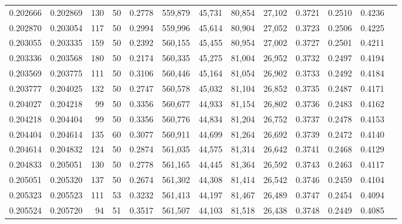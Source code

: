 \begin{tabular}{rrrrrrrrrrrrr}
0.202666 & 0.202869 &   130 &  50 &                                     0.2778 & 559,879 &  45,731 &  80,854 &  27,102 & 0.3721 & 0.2510 & 0.4236 \\
0.202870 & 0.203054 &   117 &  50 &                                     0.2994 & 559,996 &  45,614 &  80,904 &  27,052 & 0.3723 & 0.2506 & 0.4225 \\
0.203055 & 0.203335 &   159 &  50 &                                     0.2392 & 560,155 &  45,455 &  80,954 &  27,002 & 0.3727 & 0.2501 & 0.4211 \\
0.203336 & 0.203568 &   180 &  50 &                                     0.2174 & 560,335 &  45,275 &  81,004 &  26,952 & 0.3732 & 0.2497 & 0.4194 \\
0.203569 & 0.203775 &   111 &  50 &                                     0.3106 & 560,446 &  45,164 &  81,054 &  26,902 & 0.3733 & 0.2492 & 0.4184 \\
0.203777 & 0.204025 &   132 &  50 &                                     0.2747 & 560,578 &  45,032 &  81,104 &  26,852 & 0.3735 & 0.2487 & 0.4171 \\
0.204027 & 0.204218 &    99 &  50 &                                     0.3356 & 560,677 &  44,933 &  81,154 &  26,802 & 0.3736 & 0.2483 & 0.4162 \\
0.204218 & 0.204404 &    99 &  50 &                                     0.3356 & 560,776 &  44,834 &  81,204 &  26,752 & 0.3737 & 0.2478 & 0.4153 \\
0.204404 & 0.204614 &   135 &  60 &                                     0.3077 & 560,911 &  44,699 &  81,264 &  26,692 & 0.3739 & 0.2472 & 0.4140 \\
0.204614 & 0.204832 &   124 &  50 &                                     0.2874 & 561,035 &  44,575 &  81,314 &  26,642 & 0.3741 & 0.2468 & 0.4129 \\
0.204833 & 0.205051 &   130 &  50 &                                     0.2778 & 561,165 &  44,445 &  81,364 &  26,592 & 0.3743 & 0.2463 & 0.4117 \\
0.205051 & 0.205320 &   137 &  50 &                                     0.2674 & 561,302 &  44,308 &  81,414 &  26,542 & 0.3746 & 0.2459 & 0.4104 \\
0.205323 & 0.205523 &   111 &  53 &                                     0.3232 & 561,413 &  44,197 &  81,467 &  26,489 & 0.3747 & 0.2454 & 0.4094 \\
0.205524 & 0.205720 &    94 &  51 &                                     0.3517 & 561,507 &  44,103 &  81,518 &  26,438 & 0.3748 & 0.2449 & 0.4085 \\

\end{tabular}

